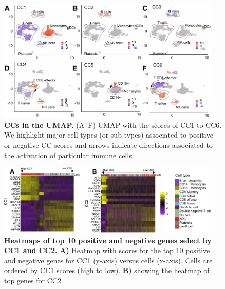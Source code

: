 \begin{figure}[!ht]
	\centering
	\includegraphics[width=0.95\textwidth]{CC_UMAP/fig}
	\vspace{0.1cm}
	\caption[CCs in the UMAP.]{\textbf{CCs in the UMAP.} (A–F) UMAP with the scores of CC1 to CC6. We highlight major cell types (or sub-types) associated to positive or negative CC scores and arrows indicate directions associated to the activation of particular immune cells}
	\label{fig:CC_UMAP}
\end{figure}


\begin{figure}[!ht]
	\centering
	\includegraphics[width=0.95\textwidth]{CC_Genes/fig}
	\vspace{0.1cm}
	\caption[Heatmaps of top 10 positive and negative genes select by CC1 and CC2.]{\textbf{Heatmaps of top 10 positive and negative genes select by CC1 and CC2.} \textbf{A)} Heatmap with scores for the top 10 positive and negative genes for CC1 (y-axis) versus cells (x-axis). Cells are ordered by CC1 scores (high to low). \textbf{B)} showing the heatmap of top genes for CC2}
	\label{fig:CC_Genes}
\end{figure}


